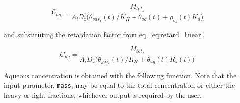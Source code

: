 \documentclass[]{article}
\begin{document}
\begin{equation}
C_{aq} = \frac{M_{tot_z} }{ A_iD_z \Big( \theta_{gas_z}(t)/K_H + \theta_{aq}(t) + \rho_{b_z}(t)K_d \Big)}
\label{eq:mass_tot_conc_aq2}  
\end{equation}

and substituting the retardation factor from eq. \ref{eq:retard_linear},

\begin{equation}
C_{aq} = \frac{M_{tot_z} }{ A_iD_z \Big( \theta_{gas_z}(t)/K_H + \theta_{aq}(t)R_z(t) \Big)}
\label{eq:mass_tot_conc_aq2}  
\end{equation}

Aqueous concentration is obtained with the following function. Note that
the input parameter, \texttt{mass}, may be equal to the total
concentration or either the heavy or light fractions, whichever output
is required by the user.
\end{document}
